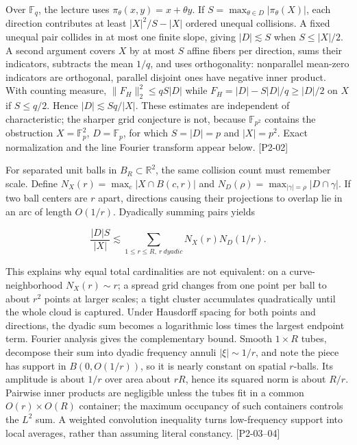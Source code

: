 Over \(\mathbb F_q\), the lecture uses \(\pi_\theta(x,y)=x+\theta y\). If \(S=\max_{\theta\in D}|\pi_\theta(X)|\), each direction contributes at least \(|X|^2/S-|X|\) ordered unequal collisions. A fixed unequal pair collides in at most one finite slope, giving \(|D|\lesssim S\) when \(S\le|X|/2\). A second argument covers \(X\) by at most \(S\) affine fibers per direction, sums their indicators, subtracts the mean \(1/q\), and uses orthogonality: nonparallel mean-zero indicators are orthogonal, parallel disjoint ones have negative inner product. With counting measure, \(\|F_H\|_2^2\le qS|D|\) while \(F_H=|D|-S|D|/q\ge|D|/2\) on \(X\) if \(S\le q/2\). Hence \(|D|\lesssim Sq/|X|\). These estimates are independent of characteristic; the sharper grid conjecture is not, because \(\mathbb F_{p^2}\) contains the obstruction \(X=\mathbb F_p^2\), \(D=\mathbb F_p\), for which \(S=|D|=p\) and \(|X|=p^2\). Exact normalization and the line Fourier transform appear below. {[}P2-02{]}

For separated unit balls in \(B_R\subset\mathbb R^2\), the same collision count must remember scale. Define \(N_X(r)=\max_c|X\cap B(c,r)|\) and \(N_D(\rho)=\max_{|\gamma|=\rho}|D\cap\gamma|\). If two ball centers are \(r\) apart, directions causing their projections to overlap lie in an arc of length \(O(1/r)\). Dyadically summing pairs yields

\[\frac{|D|S}{|X|}\lesssim\sum_{1\le r\le R,\ r\ dyadic}N_X(r)N_D(1/r).\]

This explains why equal total cardinalities are not equivalent: on a curve-neighborhood \(N_X(r)\sim r\); a spread grid changes from one point per ball to about \(r^2\) points at larger scales; a tight cluster accumulates quadratically until the whole cloud is captured. Under Hausdorff spacing for both points and directions, the dyadic sum becomes a logarithmic loss times the largest endpoint term. Fourier analysis gives the complementary bound. Smooth \(1\times R\) tubes, decompose their sum into dyadic frequency annuli \(|\xi|\sim1/r\), and note the piece has support in \(B(0,O(1/r))\), so it is nearly constant on spatial \(r\)-balls. Its amplitude is about \(1/r\) over area about \(rR\), hence its squared norm is about \(R/r\). Pairwise inner products are negligible unless the tubes fit in a common \(O(r)\times O(R)\) container; the maximum occupancy of such containers controls the \(L^2\) sum. A weighted convolution inequality turns low-frequency support into local averages, rather than assuming literal constancy. {[}P2-03--04{]}

